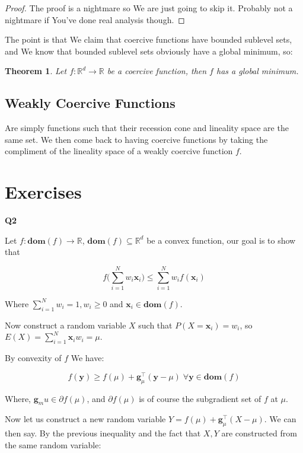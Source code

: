 \documentclass{article}
\newtheorem{theorem}{Theorem}[section]
\begin{document}
		\begin{proof}
			The proof is a nightmare so We are just going to skip it. Probably not a nightmare if You've done real analysis though.
		\end{proof}
			
			The point is that We claim that coercive functions have bounded sublevel sets, and We know that bounded sublevel sets obviously have a global minimum, so:
		
		\begin{theorem}
			Let $f:\mathbb{R}^d\to\mathbb{R}$ be a coercive function, then $f$ has a global minimum.
		\end{theorem}
		
	\subsection{Weakly Coercive Functions}
	
		Are simply functions such that their recession cone and lineality space are the same set. We then come back to having coercive functions by taking the compliment of the lineality space of a weakly coercive function $f$.
		
\newpage

\section{Exercises}

	\textbf{Q2}
	
		Let $f:\mathbf{dom}(f)\to\mathbb{R}$, $\mathbf{dom}(f)\subseteq \mathbb{R}^d$ be a convex function, our goal is to show that
		
		\[ f\bigg(\sum^N_{i=1} w_i \mathbf{x}_i \bigg) \le \sum^N_{i=1} w_i f( \mathbf{x}_i) \]
		
		Where $\sum^N_{i=1} w_i = 1, w_i\ge 0$ and $\mathbf{x}_i\in\mathbf{dom}(f)$. 
		
		Now construct a random variable $X$ such that $P(X=\mathbf{x}_i) = w_i$, so $E(X) = \sum^N_{i=1} \mathbf{x}_i w_i = \mu$.
		
		By convexity of $f$ We have:
		
		\[  f(\mathbf{y}) \ge f(\mu) + \mathbf{g}^\top_\mu (\mathbf{y}-\mu)\; \forall\mathbf{y}\in\mathbf{dom}(f)\]
		
		Where,  $\mathbf{g}_mu \in \partial f(\mu)$, and $\partial f(\mu)$ is of course the subgradient set of $f$ at $\mu$. 
		
		Now let us construct a new random variable $Y =  f(\mu) + \mathbf{g}^\top_\mu (X-\mu)$.  We can  then say. By the previous inequality and the fact that $X, Y$ are constructed from the same random variable:
		
\end{document}
